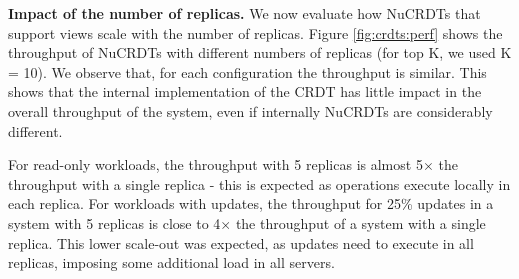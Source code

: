 \documentclass[sigplan,twocolumn,review,anonymous]{acmart}
\begin{document}
\noindent
\textbf{Impact of the number of replicas.}
We now evaluate how NuCRDTs that support views scale with the number of replicas. 
Figure \ref{fig:crdts:perf} shows the throughput of NuCRDTs with different numbers of replicas
(for top K,  we used K = 10). 
We observe that, 
for each configuration the throughput is similar.  This shows that the internal implementation of
the CRDT has little impact in the overall throughput of the system, even if internally NuCRDTs are
considerably different.

For read-only workloads, the throughput with 5 replicas is almost 5$\times$
the throughput with a single replica - this is expected as operations execute locally in each replica. 
For workloads with updates, the throughput for 25\% updates in a system with 5 replicas is
close to 4$\times$ the
throughput of a system with a single replica. This lower scale-out was expected, as updates need to execute in all replicas,
imposing some additional load in all servers.


\end{document}
